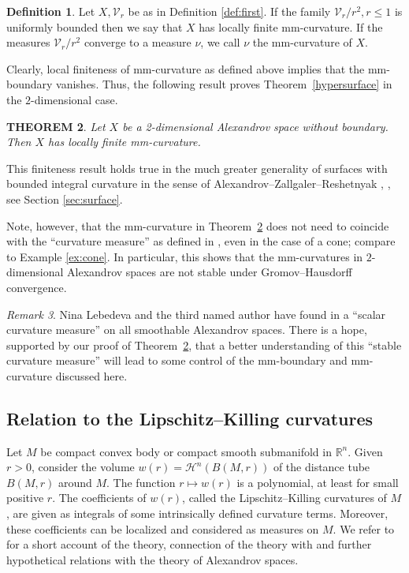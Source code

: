 \documentclass[12pt,leqno,intlimits]{amsart}
\numberwithin{equation}{section}
\newtheorem{thm}{THEOREM}[section]
\theoremstyle{definition}
\newtheorem{defn}[thm]{Definition}%
\theoremstyle{remark}
\newtheorem{rem}[thm]{Remark}
\newcommand{\tref}[1]{Theorem~\ref{#1}}
\newcommand{\R}{\mathbb{R}}
\begin{document}
\begin{defn}
Let $X,\mathcal{V}_r$ be as in Definition \ref{def:first}.
If the family $\mathcal{V}_r /r^2, r\leq 1$ is uniformly bounded then we say that $X$ has locally finite mm-curvature.
If the measures $\mathcal{V}_r /r^2$ converge to a measure $\nu$, we call $\nu$ the mm-curvature of $X$.
\end{defn}

Clearly, local finiteness of mm-curvature as defined above implies that the mm-boundary vanishes.
Thus, the following result proves \tref{hypersurface} in the $2$-dimensional case.

\begin{thm} \label{intsurface}
Let $X$ be a 2-dimensional Alexandrov space without boundary.
Then $X$ has locally finite mm-curvature.
\end{thm}

This finiteness result holds true in the much greater generality of surfaces with bounded integral curvature in the sense of Alexandrov--Zallgaler--Reshetnyak \cite{Reshetnyak-GeomIV}, \cite{AZ}, see Section \ref{sec:surface}.

Note, however, that the mm-curvature
in \tref{intsurface} does not need to coincide with the ``curvature measure'' as defined in \cite{AZ}, even in the case of a cone; compare to Example \ref{ex:cone}.
In particular, this shows that the mm-curvatures in $2$-dimensional Alexandrov spaces are not stable under Gromov--Hausdorff convergence.

\begin{rem}
Nina Lebedeva and the third named author have found in \cite{LP} a ``scalar curvature measure'' on all smoothable Alexandrov spaces.
There is a hope, supported by our proof of \tref{intsurface}, that a better understanding of this ``stable curvature measure'' will
lead to some control of the mm-boundary and mm-curvature discussed here.
\end{rem}
\subsection{Relation to the Lipschitz--Killing curvatures} Let $M$ be compact convex body or compact smooth submanifold in $\R^n$.
Given $r>0$, consider the volume $w(r)=\mathcal H^n (B(M,r))$ of the distance tube $B(M,r)$ around $M$.
The function $r\mapsto w(r)$ is a polynomial, at least for small positive $r$. The coefficients of $w(r)$,  called the  Lipschitz--Killing curvatures of $M$, are given as integrals of some intrinsically defined curvature terms.
Moreover, these coefficients can be localized and considered as measures on $M$.
We refer to \cite{Alesker} for a short account of the theory, connection of the theory with
\cite{LP} and further hypothetical relations with the theory of Alexandrov spaces.
\end{document}
